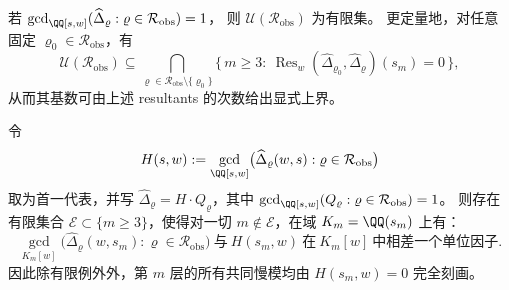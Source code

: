 \begin{corollary}[有限可证伪性：无统一扇区 \texorpdfstring{$\Rightarrow$}{=>} 共同慢模层必有限]\label{cor:cyclotomic-specialization-falsifiability}
若
\(
\gcd_{\QQ[s,w]}(\widehat{\Delta}_{\varrho}:\varrho\in\mathcal{R}_{\mathrm{obs}})=1
\)，
则 \(\mathcal{U}(\mathcal{R}_{\mathrm{obs}})\) 为有限集。
更定量地，对任意固定 \(\varrho_0\in\mathcal{R}_{\mathrm{obs}}\)，有
\[
\mathcal{U}(\mathcal{R}_{\mathrm{obs}})
\subseteq
\bigcap_{\varrho\in\mathcal{R}_{\mathrm{obs}}\setminus\{\varrho_0\}}
\bigl\{\,m\ge 3:\ \operatorname{Res}_{w}(\widehat{\Delta}_{\varrho_0},\widehat{\Delta}_{\varrho})(s_m)=0\,\bigr\},
\]
从而其基数可由上述 resultants 的次数给出显式上界。
\end{corollary}

\begin{theorem}\label{thm:cyclotomic-gcd-stability}
令
\[
H(s,w):=\gcd_{\QQ[s,w]}\bigl(\widehat{\Delta}_{\varrho}(w,s):\varrho\in\mathcal{R}_{\mathrm{obs}}\bigr)
\]
取为首一代表，并写 \(\widehat{\Delta}_{\varrho}=H\cdot Q_{\varrho}\)，其中
\(
\gcd_{\QQ[s,w]}(Q_{\varrho}:\varrho\in\mathcal{R}_{\mathrm{obs}})=1
\)。
则存在有限集合 \(\mathcal{E}\subset\{m\ge 3\}\)，使得对一切 \(m\notin\mathcal{E}\)，在域 \(K_m=\QQ(s_m)\) 上有：
\[
\gcd_{K_m[w]}\bigl(\widehat{\Delta}_{\varrho}(w,s_m):\varrho\in\mathcal{R}_{\mathrm{obs}}\bigr)
\ \text{与}\ H(s_m,w)\ \text{在}\ K_m[w]\ \text{中相差一个单位因子}.
\]
因此除有限例外外，第 \(m\) 层的所有共同慢模均由 \(H(s_m,w)=0\) 完全刻画。
\end{theorem}


